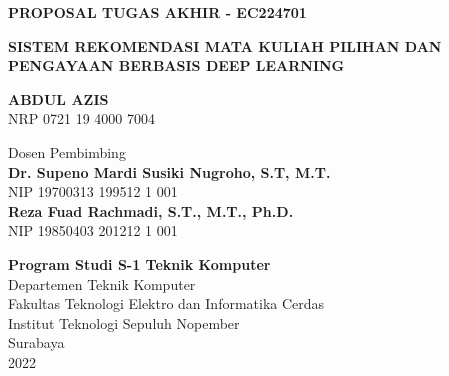 {

\textbf{PROPOSAL TUGAS AKHIR - EC224701}

\vspace{2cm}

\uppercase{\textbf{Sistem rekomendasi Mata Kuliah Pilihan dan Pengayaan berbasis Deep Learning}}

\vspace{2cm}

\uppercase{\textbf{Abdul Azis}} \\
NRP 0721 19 4000 7004

\vspace*{2cm}

Dosen Pembimbing \\
\textbf{Dr. Supeno Mardi Susiki Nugroho, S.T, M.T.} \\
NIP 19700313 199512 1 001 \\

\textbf{Reza Fuad Rachmadi, S.T., M.T., Ph.D.} \\
NIP 19850403 201212 1 001 \\

\vspace*{2cm}

\textbf{Program Studi S-1 Teknik Komputer} \\
Departemen Teknik Komputer \\
Fakultas Teknologi Elektro dan Informatika Cerdas \\
Institut Teknologi Sepuluh Nopember \\

Surabaya \\
2022 \\
}

